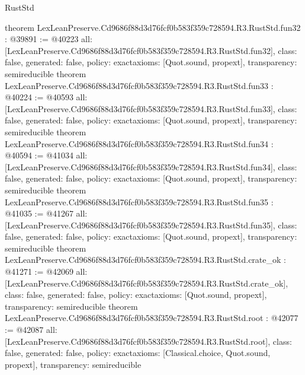 \begin{lexlean}{RustStd}
\begin{coremodule}
{}
theorem LexLeanPreserve.Cd9686f88d3d76fcf0b583f359c728594.R3.RustStd.fun32 : @39891 := @40223 {
  all: [LexLeanPreserve.Cd9686f88d3d76fcf0b583f359c728594.R3.RustStd.fun32],
  class: false,
  generated: false,
  policy: exact{axioms: [Quot.sound, propext]},
  transparency: semireducible
}
theorem LexLeanPreserve.Cd9686f88d3d76fcf0b583f359c728594.R3.RustStd.fun33 : @40224 := @40593 {
  all: [LexLeanPreserve.Cd9686f88d3d76fcf0b583f359c728594.R3.RustStd.fun33],
  class: false,
  generated: false,
  policy: exact{axioms: [Quot.sound, propext]},
  transparency: semireducible
}
theorem LexLeanPreserve.Cd9686f88d3d76fcf0b583f359c728594.R3.RustStd.fun34 : @40594 := @41034 {
  all: [LexLeanPreserve.Cd9686f88d3d76fcf0b583f359c728594.R3.RustStd.fun34],
  class: false,
  generated: false,
  policy: exact{axioms: [Quot.sound, propext]},
  transparency: semireducible
}
theorem LexLeanPreserve.Cd9686f88d3d76fcf0b583f359c728594.R3.RustStd.fun35 : @41035 := @41267 {
  all: [LexLeanPreserve.Cd9686f88d3d76fcf0b583f359c728594.R3.RustStd.fun35],
  class: false,
  generated: false,
  policy: exact{axioms: [Quot.sound, propext]},
  transparency: semireducible
}
theorem LexLeanPreserve.Cd9686f88d3d76fcf0b583f359c728594.R3.RustStd.crate_ok : @41271 := @42069 {
  all: [LexLeanPreserve.Cd9686f88d3d76fcf0b583f359c728594.R3.RustStd.crate_ok],
  class: false,
  generated: false,
  policy: exact{axioms: [Quot.sound, propext]},
  transparency: semireducible
}
theorem LexLeanPreserve.Cd9686f88d3d76fcf0b583f359c728594.R3.RustStd.root : @42077 := @42087 {
  all: [LexLeanPreserve.Cd9686f88d3d76fcf0b583f359c728594.R3.RustStd.root],
  class: false,
  generated: false,
  policy: exact{axioms: [Classical.choice, Quot.sound, propext]},
  transparency: semireducible
}


\end{coremodule}
\end{lexlean}
